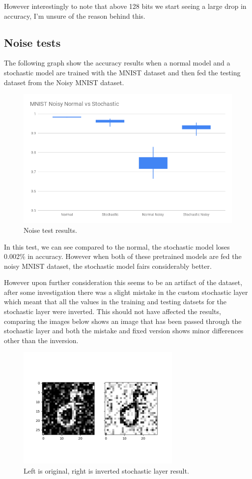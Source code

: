 \documentclass[a4paper,twoside,phd]{BYUPhys}
\begin{document}
However interestingly to note that above 128 bits we start seeing a large drop in accuracy, I'm unsure of the reason behind this.

\subsection{Noise tests}
The following graph show the accuracy results when a normal model and a stochastic model are trained with the MNIST dataset and then fed the testing dataset from the Noisy MNIST dataset.
\begin{figure}[H]
\centering
\includegraphics[width=12cm]{results/noise_test.png}
\caption{Noise test results.}
\label{fig:bitsize}
\end{figure}
In this test, we can see compared to the normal, the stochastic model loses 0.002\% in accuracy. However when both of these pretrained models are fed the noisy MNIST dataset, the stochastic model fairs considerably better.

However upon further consideration this seems to be an artifact of the dataset, after some investigation there was a slight mistake in the custom stochastic layer which meant that all the values in the training and testing datsets for the stochastic layer were inverted. 
This should not have affected the results, comparing the images below shows an image that has been passed through the stochastic layer and both the mistake and fixed version shows minor differences other than the inversion.
\begin{figure}[H]
\centering
\includegraphics[width=8cm]{results/stochastic_layer_pass_inverted.png}
\caption{Left is original, right is inverted stochastic layer result.}
\label{fig:stochastic_inverted}
\end{figure}
\end{document}
